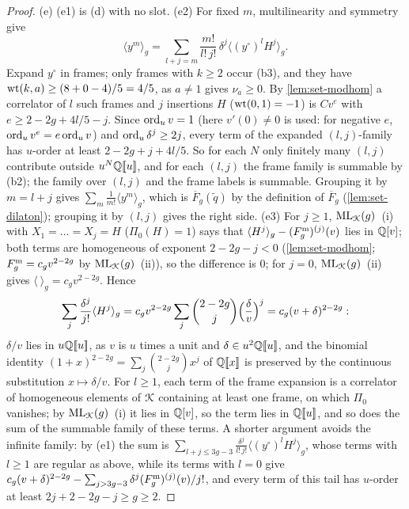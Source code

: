 \begin{proof}
(e) (e1) is (d) with no slot. (e2) For fixed $m$, multilinearity and symmetry give
\[
\langle y^m\rangle_g = \sum_{l+j=m}\frac{m!}{l!\,j!}\,\delta^j\langle(y^\circ)^lH^j\rangle_g .
\]
Expand $y^\circ$ in frames; only frames with $k\geq 2$ occur (b3), and they have $\operatorname{wt}(k,a)\geq(8+0-4)/5 = 4/5$, as $a\neq 1$ gives $\nu_a\geq 0$. By \cref{lem:set-modhom} a correlator of $l$ such frames and $j$ insertions $H$ ($\operatorname{wt}(0,1) = -1$) is $Cv^e$ with $e\geq 2-2g+4l/5-j$. Since $\operatorname{ord}_uv = 1$ (here $v'(0)\neq 0$ is used: for negative $e$, $\operatorname{ord}_uv^e = e\operatorname{ord}_uv$) and $\operatorname{ord}_u\delta^j\geq 2j$, every term of the expanded $(l,j)$-family has $u$-order at least $2-2g+j+4l/5$. So for each $N$ only finitely many $(l,j)$ contribute outside $u^N\mathbb{Q}[\![ u ]\!]$, and for each $(l,j)$ the frame family is summable by (b2); the family over $(l,j)$ and the frame labels is summable. Grouping it by $m = l+j$ gives $\sum_m\frac1{m!}\langle y^m\rangle_g$, which is $\overline F_g(\tilde q)$ by the definition of $\overline F_g$ (\cref{lem:set-dilaton}); grouping it by $(l,j)$ gives the right side. (e3) For $j\geq 1$, $\mathrm{ML}_{\mathcal{K}}(g)$~(i) with $X_1 = \dots = X_j = H$ ($\Pi_0(H) = 1$) says that $\langle H^j\rangle_g-(F^{\mathrm{m}}_g)^{(j)}(v)$ lies in $\mathbb{Q}[v]$; both terms are homogeneous of exponent $2-2g-j<0$ (\cref{lem:set-modhom}; $F^{\mathrm{m}}_g = c_gv^{2-2g}$ by $\mathrm{ML}_{\mathcal{K}}(g)$~(ii)), so the difference is $0$; for $j = 0$, $\mathrm{ML}_{\mathcal{K}}(g)$~(ii) gives $\langle\ \rangle_g = c_gv^{2-2g}$. Hence
\[
\sum_j\frac{\delta^j}{j!}\langle H^j\rangle_g = c_gv^{2-2g}\sum_j\binom{2-2g}{j}\Bigl(\frac{\delta}{v}\Bigr)^j = c_g(v+\delta)^{2-2g}:
\]
$\delta/v$ lies in $u\mathbb{Q}[\![ u ]\!]$, as $v$ is $u$ times a unit and $\delta\in u^2\mathbb{Q}[\![ u ]\!]$, and the binomial identity $(1+x)^{2-2g} = \sum_j\binom{2-2g}{j}x^j$ of $\mathbb{Q}[\![ x ]\!]$ is preserved by the continuous substitution $x\mapsto\delta/v$. For $l\geq 1$, each term of the frame expansion is a correlator of homogeneous elements of $\mathcal{K}$ containing at least one frame, on which $\Pi_0$ vanishes; by $\mathrm{ML}_{\mathcal{K}}(g)$~(i) it lies in $\mathbb{Q}[v]$, so the term lies in $\mathbb{Q}[\![ u ]\!]$, and so does the sum of the summable family of these terms. A shorter argument avoids the infinite family: by (e1) the sum is $\sum_{l+j\leq 3g-3}\frac{\delta^j}{l!\,j!}\langle(y^\circ)^lH^j\rangle_g$, whose terms with $l\geq 1$ are regular as above, while its terms with $l = 0$ give $c_g(v+\delta)^{2-2g}-\sum_{j>3g-3}\delta^j(F^{\mathrm{m}}_g)^{(j)}(v)/j!$, and every term of this tail has $u$-order at least $2j+2-2g-j\geq g\geq 2$.


\end{proof}
